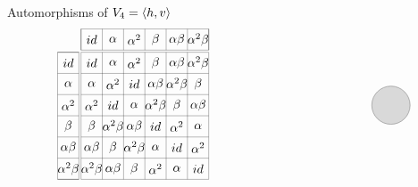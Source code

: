 \documentclass[8pt, handout]{beamer}
\newcommand{\Pause}{}      %
\begin{document}
\begin{frame}{Automorphisms of $V_4=\langle h,v\rangle$}
\[\begin{tikzpicture}[scale=.75]
\begin{scope}[scale=0.8,shift={(-14,-4.5)}]
      \foreach \i in {1,...,\n} {
        \draw [very thin] (\i,1) -- (\i,\n); 
        \draw [very thin] (\i,\n+.1) -- (\i,\n+1.1); 
        \draw [very thin] (1,\i) -- (\n,\i); 
        \draw [very thin] (-0.1,\i) -- (.9,\i); 
      } 
      \draw [very thin] (1,\n+.1) rectangle (\n,\n+1.1);
      \draw [very thin] (-0.1,1) rectangle (.9,\n);
      \node at (0.4,6.5) {$id$};
      \node at (0.4,5.5) {$\alpha$};
      \node at (0.4,4.5) {$\alpha^2$};
      \node at (0.4,3.5) {$\beta$};
      \node at (0.4,2.5) {$\alpha\beta$};
      \node at (0.4,1.5) {$\alpha^2\beta$};
      \node at (1.5,7.6) {$id$};
      \node at (2.5,7.6) {$\alpha$};
      \node at (3.5,7.6) {$\alpha^2$};
      \node at (4.5,7.6) {$\beta$};
      \node at (5.5,7.6) {$\alpha\beta$};
      \node at (6.5,7.6) {$\alpha^2\beta$}; %
      \node at (1.5,6.5) {$id$};
      \node at (1.5,5.5) {$\alpha$};
      \node at (1.5,4.5) {$\alpha^2$};
      \node at (1.5,3.5) {$\beta$};
      \node at (1.5,2.5) {$\alpha\beta$};
      \node at (1.5,1.5) {$\alpha^2\beta$};
      \node at (2.5,6.5) {$\alpha$};
      \node at (2.5,5.5) {$\alpha^2$};
      \node at (2.5,4.5) {$id$};
      \node at (2.5,3.5) {$\alpha^2\beta$};
      \node at (2.5,2.5) {$\beta$};
      \node at (2.5,1.5) {$\alpha\beta$};
      \node at (3.5,6.5) {$\alpha^2$};
      \node at (3.5,5.5) {$id$};
      \node at (3.5,4.5) {$\alpha$};
      \node at (3.5,3.5) {$\alpha\beta$};
      \node at (3.5,2.5) {$\alpha^2\beta$};
      \node at (3.5,1.5) {$\beta$};
      \node at (4.5,6.5) {$\beta$};
      \node at (4.5,5.5) {$\alpha\beta$};
      \node at (4.5,4.5) {$\alpha^2\beta$};
      \node at (4.5,3.5) {$id$};
      \node at (4.5,2.5) {$\alpha$};
      \node at (4.5,1.5) {$\alpha^2$};
      \node at (5.5,6.5) {$\alpha\beta$};
      \node at (5.5,5.5) {$\alpha^2\beta$};
      \node at (5.5,4.5) {$\beta$};
      \node at (5.5,3.5) {$\alpha^2$};
      \node at (5.5,2.5) {$id$};
      \node at (5.5,1.5) {$\alpha$};
      \node at (6.5,6.5) {$\alpha^2\beta$};
      \node at (6.5,5.5) {$\beta$};
      \node at (6.5,4.5) {$\alpha\beta$};
      \node at (6.5,3.5) {$\alpha$};
      \node at (6.5,2.5) {$\alpha^2$};
      \node at (6.5,1.5) {$id$};
    \end{scope}
    \begin{scope}[shift={(0,0)}]
      \begin{scope}[shift={(0:1.25)},scale=.12]
        \draw[gray, fill=lightgray] (0,0) circle (60mm);

\end{scope}
\end{scope}
\end{tikzpicture}\]
\end{frame}
\end{document}
